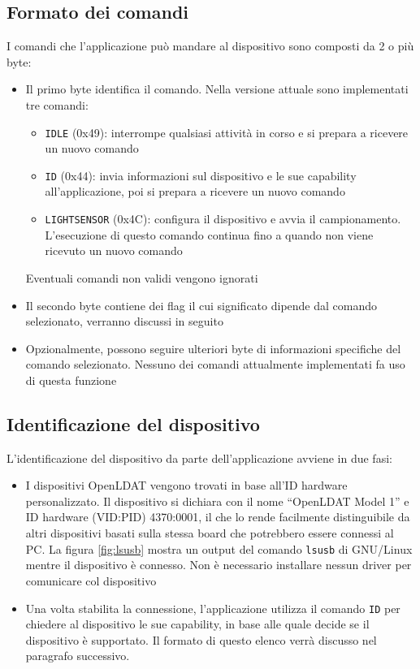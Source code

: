 \subsection{Formato dei comandi}
I comandi che l'applicazione può mandare al dispositivo sono composti da 2 o più byte:
\begin{itemize}
	\item Il primo byte identifica il comando. Nella versione attuale sono implementati tre comandi: \begin{itemize}
		\item \texttt{IDLE} (0x49): interrompe qualsiasi attività in corso e si prepara a ricevere un nuovo comando
		\item \texttt{ID} (0x44): invia informazioni sul dispositivo e le sue capability all'applicazione, poi si prepara a ricevere un nuovo comando
		\item \texttt{LIGHTSENSOR} (0x4C): configura il dispositivo e avvia il campionamento. L'esecuzione di questo comando continua fino a quando non viene ricevuto un nuovo comando
	\end{itemize}
	Eventuali comandi non validi vengono ignorati
	\item Il secondo byte contiene dei flag il cui significato dipende dal comando selezionato, verranno discussi in seguito
	\item Opzionalmente, possono seguire ulteriori byte di informazioni specifiche del comando selezionato. Nessuno dei comandi attualmente implementati fa uso di questa funzione
\end{itemize}

\subsection{Identificazione del dispositivo}
L'identificazione del dispositivo da parte dell'applicazione avviene in due fasi:
\begin{itemize}
	\item I dispositivi OpenLDAT vengono trovati in base all'ID hardware personalizzato. Il dispositivo si dichiara con il nome ``OpenLDAT Model 1'' e ID hardware (VID:PID) 4370:0001, il che lo rende facilmente distinguibile da altri dispositivi basati sulla stessa board che potrebbero essere connessi al PC. La figura \ref{fig:lsusb} mostra un output del comando \texttt{lsusb} di GNU/Linux mentre il dispositivo è connesso. Non è necessario installare nessun driver per comunicare col dispositivo
	\item Una volta stabilita la connessione, l'applicazione utilizza il comando \texttt{ID} per chiedere al dispositivo le sue capability, in base alle quale decide se il dispositivo è supportato. Il formato di questo elenco verrà discusso nel paragrafo successivo.
\end{itemize}

